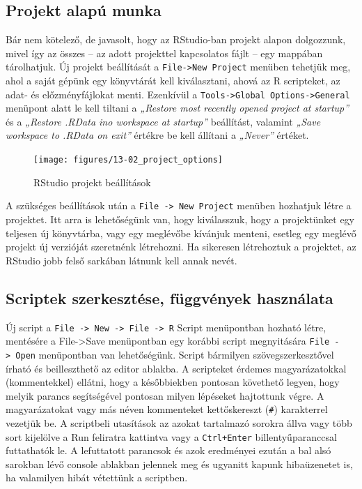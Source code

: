 \documentclass[
]{book}
\begin{document}
\hypertarget{projektmunka}{%
\subsection{Projekt alapú munka}\label{projektmunka}}

Bár nem kötelező, de javasolt, hogy az RStudio-ban projekt alapon
dolgozzunk, mivel így az összes -- az adott projekttel kapcsolatos fájlt
-- egy mappában tárolhatjuk. Új projekt beállítását a
\texttt{File-\textgreater{}New\ Project} menüben tehetjük meg, ahol a
saját gépünk egy könyvtárát kell kiválasztani, ahová az R scripteket, az
adat- és előzményfájlokat menti. Ezenkívül a
\texttt{Tools-\textgreater{}Global\ Options-\textgreater{}General}
menüpont alatt le kell tiltani a \emph{„Restore most recently opened
project at startup''} és a \emph{„Restore .RData ino workspace at
startup''} beállítást, valamint \emph{„Save workspace to .RData on
exit''} értékre be kell állítani a \emph{„Never''} értéket.

\begin{figure}

{\centering \texttt{[image: figures/13-02\_project\_options]} 

}

\caption{RStudio projekt beállítások}\label{fig:unnamed-chunk-106}
\end{figure}

A szükséges beállítások után a
\texttt{File\ -\textgreater{}\ New\ Project} menüben hozhatjuk létre a
projektet. Itt arra is lehetőségünk van, hogy kiválasszuk, hogy a
projektünket egy teljesen új könyvtárba, vagy egy meglévőbe kívánjuk
menteni, esetleg egy meglévő projekt új verzióját szeretnénk létrehozni.
Ha sikeresen létrehoztuk a projektet, az RStudio jobb felső sarkában
látnunk kell annak nevét.

\hypertarget{scriptek-szerkesztuxe9se-fuxfcggvuxe9nyek-hasznuxe1lata}{%
\subsection{Scriptek szerkesztése, függvények
használata}\label{scriptek-szerkesztuxe9se-fuxfcggvuxe9nyek-hasznuxe1lata}}

Új script a
\texttt{File\ -\textgreater{}\ New\ -\textgreater{}\ File\ -\textgreater{}\ R}
Script menüpontban hozható létre, mentésére a File-\textgreater Save
menüpontban egy korábbi script megnyitására
\texttt{File\ -\textgreater{}\ Open} menüpontban van lehetőségünk.
Script bármilyen szövegszerkesztővel írható és beilleszthető az editor
ablakba. A scripteket érdemes magyarázatokkal (kommentekkel) ellátni,
hogy a későbbiekben pontosan követhető legyen, hogy melyik parancs
segítségével pontosan milyen lépéseket hajtottunk végre. A
magyarázatokat vagy más néven kommenteket kettőskereszt (\texttt{\#})
karakterrel vezetjük be. A scriptbeli utasítások az azokat tartalmazó
sorokra állva vagy több sort kijelölve a Run feliratra kattintva vagy a
\texttt{Ctrl+Enter} billentyűparanccsal futtathatók le. A lefuttatott
parancsok és azok eredményei ezután a bal alsó sarokban lévő console
ablakban jelennek meg és ugyanitt kapunk hibaüzenetet is, ha valamilyen
hibát vétettünk a scriptben.
\end{document}
